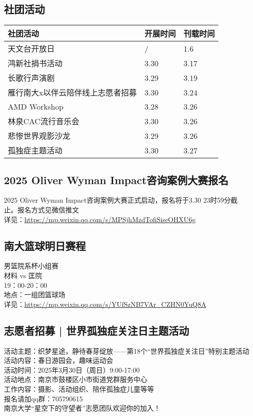 \documentclass[letterpaper, 12pt]{article}
\begin{document}
\begin{multicols}{2}
\section{社团活动}
\begin{tabular}{|>{\centering\arraybackslash}m{}|m{}|m{}|}
    \hline
    社团活动 & 开展时间 & 刊载时间\\
    \hline\hline
    天文台开放日 & / & 1.6\\
    鸿新社捐书活动 & 3.30 & 3.17\\
    长歌行声演剧 & 3.29 & 3.19\\
    雁行南大x以伴云陪伴线上志愿者招募 & 3.30 & 3.24\\
    AMD Workshop & 3.28 & 3.26\\
    林泉CAC流行音乐会 & 3.30 & 3.26\\
    悲惨世界观影沙龙 & 3.29 & 3.26\\
    孤独症主题活动 & 3.30 & 3.27\\
    
    \hline
\end{tabular}
\subsection{2025 Oliver Wyman Impact咨询案例大赛报名}
2025 Oliver Wyman Impact咨询案例大赛正式启动，报名将于3.30 23时59分截止。报名方式见微信推文
\\详见：\url{https://mp.weixin.qq.com/s/MPSjhMzdTofiSiseOHXU6g}


\subsection{南大篮球明日赛程}
男篮院系杯小组赛
\\材料 vs 匡院 
\\19：00-20：00
\\地点：一组团篮球场
\\详见：\url{https://mp.weixin.qq.com/s/YUfSzNB7VAr_CZHN0YuQ8A}


\subsection{志愿者招募 | 世界孤独症关注日主题活动}
活动主题：织梦星途，静待春芽绽放——第18个“世界孤独症关注日”特别主题活动
\\活动内容：春日游园会，趣味运动会
\\活动时间：2025年3月30日（周日）9:00-17:00
\\活动地点：南京市鼓楼区小市街道党群服务中心
\\工作内容：摄影、活动组织、陪伴孤独症儿童等等
\\报名请加qq群：705790615
\\南京大学“星空下的守望者”志愿团队欢迎你的加入！
\end{multicols}
\end{document}
